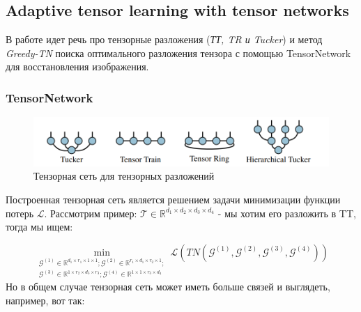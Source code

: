\subsection{Adaptive tensor learning with tensor networks}


В работе идет речь про тензорные разложения (\textit{ТТ, TR и Tucker}) и  метод \textit{Greedy-TN} поиска оптимального разложения тензора с помощью TensorNetwork для восстановления изображения.
\subsubsection{TensorNetwork} 

\begin{figure}[h!tp]
\centering
\includegraphics[scale=0.5]{Adaptive tensor learning with tensor networks/DecompTN.PNG}
\caption{Тензорная сеть для тензорных разложений}
\label{fig:TensorNetExamples}
\end{figure}


Построенная тензорная сеть является решением задачи минимизации функции потерь $\mathcal{L}$. 
Рассмотрим пример: $\mathcal{T} \in \mathbb{R}^{d_1 \times d_2 \times d_3 \times d_4}$ - мы хотим его разложить в TT, тогда мы ищем:


\begin{equation}\label{min_tn}
\min\limits_{
\begin{split}
\mathcal{G}^{(1)}\in \mathbb{R}^{d_1 \times r_1 \times 1 \times 1} ; \mathcal{G}^{(2)} \in \mathbb{R}^{r_1 \times d_1 \times r_2 \times 1}; \\  \mathcal{G}^{(3)} \in \mathbb{R}^{1 \times r_2 \times d_3 \times r_3};\mathcal{G}^{(4)} \in \mathbb{R}^{1 \times 1 \times r_3 \times d_4}\end{split}}  \mathcal{L}(TN(\mathcal{G}^{(1)},\mathcal{G}^{(2)},\mathcal{G}^{(3)},\mathcal{G}^{(4)}))
\end{equation}
Но в общем случае тензорная сеть может иметь больше связей и выглядеть, например, вот так:


